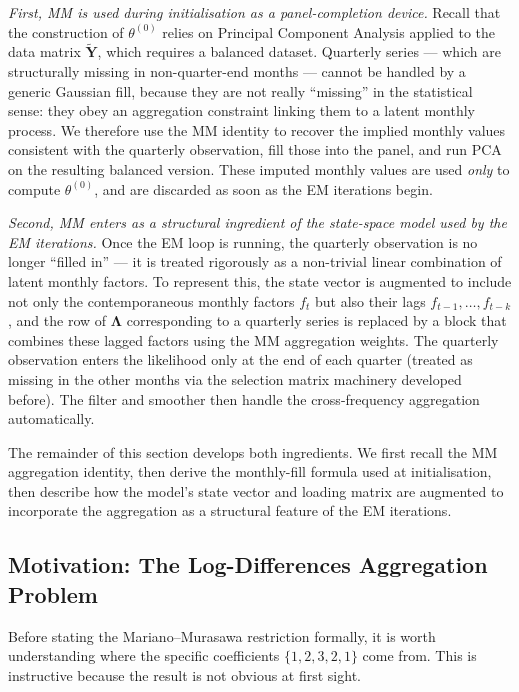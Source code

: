 \documentclass[11pt, a4paper, oneside]{article}
\newcommand{\mL}{\boldsymbol{\Lambda}}
\begin{document}
\emph{First, MM is used during initialisation as a panel-completion
device.} Recall  that the
construction of $\theta^{(0)}$ relies on Principal Component Analysis
applied to the data matrix $\widetilde{\mathbf{Y}}$, which requires a
balanced dataset. Quarterly series — which are structurally missing in
non-quarter-end months — cannot be handled by a generic Gaussian fill,
because they are not really ``missing'' in the statistical sense:
they obey an aggregation constraint linking them to a latent monthly
process. We therefore use the MM identity to recover the implied
monthly values consistent with the quarterly observation, fill those
into the panel, and run PCA on the resulting balanced version. These
imputed monthly values are used \emph{only} to compute $\theta^{(0)}$,
and are discarded as soon as the EM iterations begin.

\emph{Second, MM enters as a structural ingredient of the state-space
model used by the EM iterations.} Once the EM loop is running, the
quarterly observation is no longer ``filled in'' — it is treated
rigorously as a non-trivial linear combination of latent monthly
factors. To represent this, the state vector is augmented to include
not only the contemporaneous monthly factors $f_t$ but also their
lags $f_{t-1}, \ldots, f_{t-k}$, and the row of $\mL$
corresponding to a quarterly series is replaced by a block that
combines these lagged factors using the MM aggregation weights. The
quarterly observation enters the likelihood only at the end of each
quarter (treated as missing in the other months via the selection
matrix machinery developed before). The
filter and smoother then handle the cross-frequency aggregation
automatically.

The remainder of this section develops both ingredients. We first
recall the MM aggregation identity, then derive the monthly-fill
formula used at initialisation, then describe how the model's state
vector and loading matrix are augmented to incorporate the
aggregation as a structural feature of the EM iterations.

\subsection{Motivation: The Log-Differences Aggregation Problem}
\label{subsec:mm-motivation}

Before stating the Mariano–Murasawa restriction formally, it is worth
understanding where the specific coefficients $\{1, 2, 3, 2, 1\}$ come
from. This is instructive because the result is not obvious at first
sight.
\end{document}
